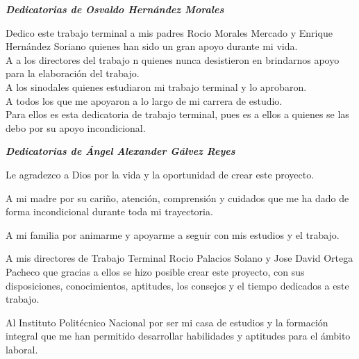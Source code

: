 \pagebreak


\begin{flushright}
  \emph{\textbf{Dedicatorias de Osvaldo Hernández Morales}}
 
Dedico este trabajo terminal a mis padres Rocio Morales Mercado y Enrique Hernández Soriano quienes han sido un gran apoyo durante mi vida.\\
\vspace{0.5cm}
A a los directores del trabajo n quienes nunca desistieron en brindarnos apoyo para la elaboración del trabajo.\\
\vspace{0.5cm}
A los sinodales quienes estudiaron mi trabajo terminal y lo aprobaron.\\
\vspace{0.5cm}
A todos los que me apoyaron a lo largo de mi carrera de estudio.\\
\vspace{0.5cm}
Para ellos es esta dedicatoria de trabajo terminal, pues es a ellos a quienes se las debo por su apoyo incondicional.

\end{flushright}
\newpage

\begin{flushright}
\emph{\textbf{Dedicatorias de Ángel Alexander Gálvez Reyes }}
 
Le agradezco a Dios por la vida y la oportunidad de crear este proyecto.\\
\vspace{0.5cm}

A mi madre por su cariño, atención, comprensión y cuidados que me ha dado de forma incondicional durante toda mi trayectoria.\\
\vspace{0.5cm}

A mi familia por animarme y apoyarme a seguir con mis estudios y el trabajo.\\
\vspace{0.5cm}

A mis directores de Trabajo Terminal Rocio Palacios Solano y Jose David Ortega Pacheco que gracias a ellos se hizo posible crear este proyecto, con sus disposiciones, conocimientos, aptitudes, los consejos y el tiempo dedicados a este trabajo.\\
\vspace{0.5cm}

Al Instituto Politécnico Nacional por ser mi casa de estudios y la formación integral que me han permitido desarrollar habilidades y aptitudes para el ámbito laboral.\\
\vspace{0.5cm}

\end{flushright}
\newpage

